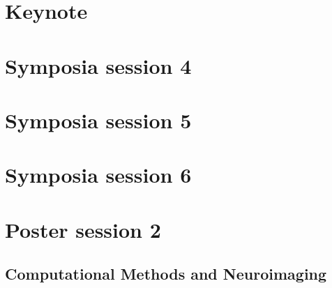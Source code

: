 
\section{Keynote}


\newpage

\section{Symposia session 4}





\newpage

\section{Symposia session 5}






\newpage

\section{Symposia session 6}





\newpage

\section{Poster session 2}

\subsection*{Computational Methods and Neuroimaging}













